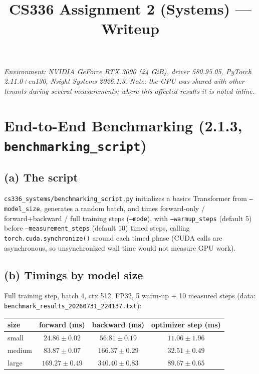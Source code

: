 \documentclass[11pt]{article}
\title{CS336 Assignment 2 (Systems) --- Writeup}
\author{}
\date{}
\newcommand{\code}[1]{\texttt{#1}}
\begin{document}
\maketitle

\noindent\emph{Environment: NVIDIA GeForce RTX 3090 (24 GiB), driver 580.95.05, PyTorch
2.11.0+cu130, Nsight Systems 2026.1.3. Note: the GPU was shared with other tenants during several
measurements; where this affected results it is noted inline.}

\section{End-to-End Benchmarking (2.1.3, \texttt{benchmarking\_script})}

\subsection{(a) The script}

\code{cs336\_systems/benchmarking\_script.py} initializes a basics Transformer from
\code{--model\_size}, generates a random batch, and times forward-only / forward+backward /
full training steps (\code{--mode}), with \code{--warmup\_steps} (default 5) before
\code{--measurement\_steps} (default 10) timed steps, calling \code{torch.cuda.synchronize()}
around each timed phase (CUDA calls are asynchronous, so unsynchronized wall time would not
measure GPU work).

\subsection{(b) Timings by model size}

Full training step, batch 4, ctx 512, FP32, 5 warm-up + 10 measured steps (data:
\code{benchmark\_results\_20260731\_224137.txt}):

\begin{center}\small
\begin{tabular}{lccc}
\toprule
size & forward (ms) & backward (ms) & optimizer step (ms) \\
\midrule
small  & $24.86 \pm 0.02$  & $56.81 \pm 0.19$  & $11.06 \pm 1.96$ \\
medium & $83.87 \pm 0.07$  & $166.37 \pm 0.29$ & $32.51 \pm 0.49$ \\
large  & $169.27 \pm 0.49$ & $340.40 \pm 0.83$ & $89.67 \pm 0.65$ \\
\bottomrule
\end{tabular}
\end{center}
\end{document}
